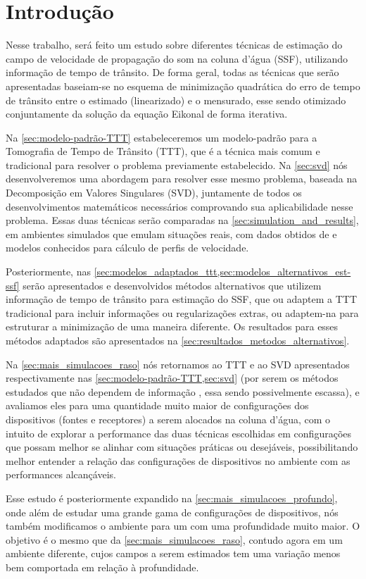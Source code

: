 \section*{Introdução}

Nesse trabalho, será feito um estudo sobre diferentes técnicas de estimação do campo de velocidade de propagação do som na coluna d'água (SSF), utilizando informação de tempo de trânsito. De forma geral, todas as técnicas que serão apresentadas baseiam-se no esquema de minimização quadrática do erro de tempo de trânsito entre o estimado (linearizado) e o mensurado, esse sendo otimizado conjuntamente da solução da equação Eikonal de forma iterativa.

Na \cref{sec:modelo-padrão-TTT} estabeleceremos um modelo-padrão para a Tomografia de Tempo de Trânsito (TTT), que é a técnica mais comum e tradicional para resolver o problema previamente estabelecido. Na \cref{sec:svd} nós desenvolveremos uma abordagem para resolver esse mesmo problema, baseada na Decomposição em Valores Singulares (SVD), juntamente de todos os desenvolvimentos matemáticos necessários comprovando sua aplicabilidade nesse problema. Essas duas técnicas serão comparadas na \cref{sec:simulation_and_results}, em ambientes simulados que emulam situações reais, com dados obtidos de  e modelos conhecidos para cálculo de perfis de velocidade.

Posteriormente, nas \cref{sec:modelos_adaptados_ttt,sec:modelos_alternativos_est-ssf} serão apresentados e desenvolvidos métodos alternativos que utilizem informação de tempo de trânsito para estimação do SSF, que ou adaptem a TTT tradicional para incluir informações ou regularizações extras, ou adaptem-na para estruturar a minimização de uma maneira diferente. Os resultados para esses métodos adaptados são apresentados na \cref{sec:resultados_metodos_alternativos}.

Na \cref{sec:mais_simulacoes_raso} nós retornamos ao TTT e ao SVD apresentados respectivamente nas \cref{sec:modelo-padrão-TTT,sec:svd} (por serem os métodos estudados que não dependem de informação , essa sendo possivelmente escassa), e avaliamos eles para uma quantidade muito maior de configurações dos dispositivos (fontes e receptores) a serem alocados na coluna d'água, com o intuito de explorar a performance das duas técnicas escolhidas em configurações que possam melhor se alinhar com situações práticas ou desejáveis, possibilitando melhor entender a relação das configurações de dispositivos no ambiente com as performances alcançáveis.

Esse estudo é posteriormente expandido na \cref{sec:mais_simulacoes_profundo}, onde além de estudar uma grande gama de configurações de dispositivos, nós também modificamos o ambiente para um com uma profundidade muito maior. O objetivo é o mesmo que da \cref{sec:mais_simulacoes_raso}, contudo agora em um ambiente diferente, cujos campos a serem estimados tem uma variação menos bem comportada em relação à profundidade.